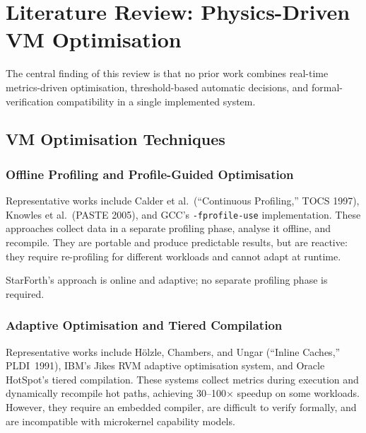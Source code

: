 
\section{Literature Review: Physics-Driven VM Optimisation}
\label{sec:literature-review}

The central finding of this review is that no prior work combines
real-time metrics-driven optimisation, threshold-based automatic decisions,
and formal-verification compatibility in a single implemented system.

\subsection{VM Optimisation Techniques}

\subsubsection{Offline Profiling and Profile-Guided Optimisation}

Representative works include Calder et al.\ (``Continuous Profiling,''
TOCS 1997), Knowles et al.\ (PASTE 2005), and GCC's \texttt{-fprofile-use}
implementation. These approaches collect data in a separate profiling phase,
analyse it offline, and recompile. They are portable and produce predictable
results, but are reactive: they require re-profiling for different workloads
and cannot adapt at runtime.

StarForth's approach is online and adaptive; no separate profiling phase
is required.

\subsubsection{Adaptive Optimisation and Tiered Compilation}

Representative works include Hölzle, Chambers, and Ungar
(``Inline Caches,'' PLDI~1991), IBM's Jikes RVM adaptive optimisation
system, and Oracle HotSpot's tiered compilation. These systems collect
metrics during execution and dynamically recompile hot paths, achieving
30--100$\times$ speedup on some workloads. However, they require an
embedded compiler, are difficult to verify formally, and are incompatible
with microkernel capability models.

